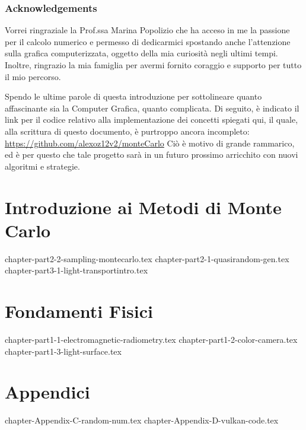 \documentclass[12pt, openany]{book}
\theoremstyle{theoremdd}
\begin{document}
	\section*{Acknowledgements}
	Vorrei ringraziale la Prof.ssa Marina Popolizio che ha acceso in me la passione per il calcolo numerico e permesso di dedicarmici spostando anche 
	l'attenzione sulla grafica computerizzata, oggetto della mia curiosit\`a negli ultimi tempi. Inoltre, ringrazio la mia famiglia per avermi fornito
	coraggio e supporto per tutto il mio percorso.\par
	Spendo le ultime parole di questa introduzione per sottolineare quanto affascinante sia la Computer Grafica, quanto complicata. Di seguito, \`e 
	indicato il link per il codice relativo alla implementazione dei concetti spiegati qui, il quale, alla scrittura di questo documento, \`e 
	purtroppo ancora incompleto: \href{https://github.com/alexoz12v2/monteCarlo}{https://github.com/alexoz12v2/monteCarlo}
	Ci\`o \`e motivo di grande rammarico, ed \`e per questo che tale progetto sar\`a in un futuro prossimo arricchito con nuovi algoritmi e strategie.

	\tableofcontents

	\mainmatter
	\part{Introduzione ai Metodi di Monte Carlo}
	{chapter-part2-2-sampling-montecarlo.tex}
	{chapter-part2-1-quasirandom-gen.tex}
	{chapter-part3-1-light-transportintro.tex}

	\part{Fondamenti Fisici}
	{chapter-part1-1-electromagnetic-radiometry.tex}
	{chapter-part1-2-color-camera.tex}
	{chapter-part1-3-light-surface.tex}

	\part{Appendici}
	\appendix
	{chapter-Appendix-C-random-num.tex}
	{chapter-Appendix-D-vulkan-code.tex}

	\backmatter
	\printbibliography

	\printglossaries
\end{document}
